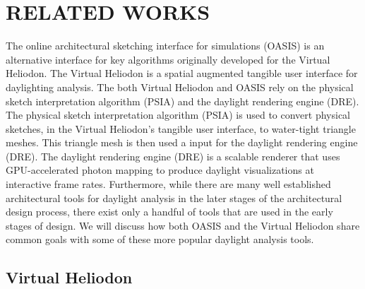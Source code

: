 \chapter{RELATED WORKS} \label{sec:introduction}

The online architectural sketching interface for simulations (OASIS) is an alternative interface for key algorithms originally developed for the Virtual Heliodon.
The Virtual Heliodon is a spatial augmented tangible user interface for daylighting analysis.
The both Virtual Heliodon and OASIS rely on the physical sketch interpretation algorithm (PSIA) and the daylight rendering engine (DRE). 
The physical sketch interpretation algorithm (PSIA) is used to convert physical sketches, in the Virtual Heliodon's tangible user interface, to water-tight triangle meshes.
This triangle mesh is then used a input for the daylight rendering engine (DRE).
The daylight rendering engine (DRE) is a scalable renderer that uses GPU-accelerated photon mapping to produce daylight visualizations at interactive frame rates.
Furthermore, while there are many well established architectural tools for daylight analysis in the later stages of the architectural design process, there exist only a handful of tools that are used in the early stages of design.
We will discuss how both OASIS and the Virtual Heliodon share common goals with some of these more popular daylight analysis tools.

\section{Virtual Heliodon}


